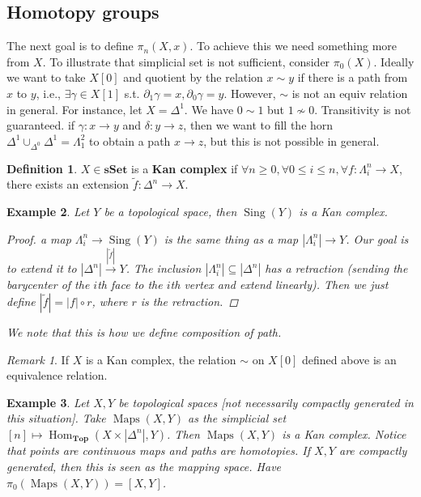 \documentclass{article}
\theoremstyle{definition}
\newtheorem{defn}{Definition}[section]
\theoremstyle{remark}
\newtheorem{rem}{Remark}
\theoremstyle{plain}
\newtheorem{example}[defn]{Example}
\begin{document}
\subsection{Homotopy groups}
The next goal is to define $\pi_n(X,x)$. To achieve this we need something more from $X$. To illustrate that simplicial set is not sufficient, consider $\pi_0(X)$. Ideally we want to take $X[0]$ and quotient by the relation $x\sim y$ if there is a path from $x$ to $y$, i.e., $\exists \gamma\in X[1]$ s.t. $\partial_1\gamma=x,\partial_0\gamma=y$. However, $\sim$ is not an equiv relation in general. For instance, let $X=\Delta^1$. We have $0\sim 1$ but $1\not\sim 0$. Transitivity is not guaranteed. if $\gamma:x\to y$ and $\delta:y\to z$, then we want to fill the horn $\Delta^1\cup_{\Delta^0}\Delta^1=\Lambda_1^2$ to obtain a path $x\to z$, but this is not possible in general.
\begin{defn}
    $X\in\mathbf{sSet}$ is a \textbf{Kan complex} if $\forall n\ge0,\forall 0\le i\le n,\forall f:\Lambda_i^n\to X$, there exists an extension $\tilde f:\Delta^n\to X$.
\end{defn}
\begin{example}
    Let $Y$ be a topological space, then $\operatorname{Sing}(Y)$ is a Kan complex.
    \begin{proof}
        a map $\Lambda_i^n\to\operatorname{Sing}(Y)$ is the same thing as a map $|\Lambda_i^n|\to Y$. Our goal is to extend it to $|\Delta^n|\overset{|\tilde f|}{\to} Y$. The inclusion $|\Lambda_i^n|\subseteq|\Delta^n|$ has a retraction (sending the barycenter of the $i$th face to the $i$th vertex and extend linearly). Then we just define $|\tilde{f}|=|f|\circ r$, where $r$ is the retraction.
    \end{proof}
    We note that this is how we define composition of path.
\end{example}
\begin{rem}
    If $X$ is a Kan complex, the relation $\sim$ on $X[0]$ defined above is an equivalence relation.
\end{rem}
\begin{example}
    Let $X, Y$ be topological spaces [not necessarily compactly generated in this situation]. Take $\operatorname{Maps}(X,Y)$ as the simplicial set $[n]\mapsto \operatorname{Hom}_{\mathbf{Top}}(X\times |\Delta^n|, Y)$. Then $\operatorname{Maps}(X,Y)$ is a Kan complex. Notice that points are continuous maps and paths are homotopies. If $X,Y$ are compactly generated, then this is seen as the mapping space. Have $\pi_0(\operatorname{Maps}(X,Y))=[X,Y]$.
\end{example}
\end{document}
